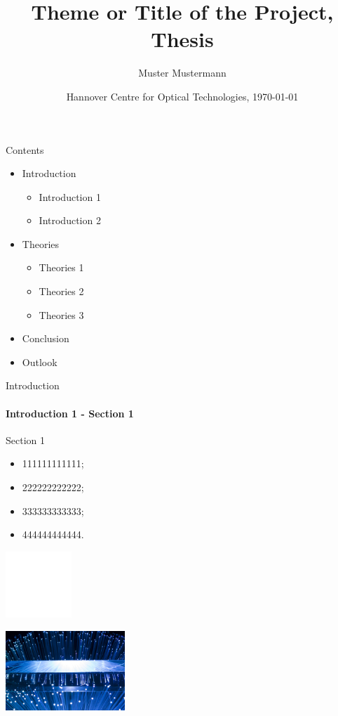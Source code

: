 \documentclass[t]{beamer}
\title{Theme or Title of the Project, Thesis}
\date[\today]{Hannover Centre for Optical Technologies, \today}
\author[Mustermann]{Muster Mustermann}
\institute[HOT]{Hannover Centre for Optical Technologies}
\begin{document}
\begin{frame}
\label{P1 Titlepage}
\titlepage
\end{frame}


\begin{frame}{Contents}
\label{P2 Content}

\begin{itemize}
  \item Introduction
    \begin{itemize}
        \item Introduction 1
	    \item Introduction 2
    \end{itemize}
    \item Theories
    \begin{itemize}
        \item Theories 1
	    \item Theories 2
	    \item Theories 3
    \end{itemize}
    \item Conclusion
    \item Outlook
\end{itemize}

\end{frame}


\begin{frame}{Introduction}
\framesubtitle{Introduction 1 - Section 1}
\label{P3 Introduction}

Section 1
\begin{itemize}
\item 111111111111;
\item 222222222222;
\item 333333333333;
\item 444444444444.
\end{itemize} 

\begin{minipage}[t]{.45\textwidth}
\centering
\includegraphics[width =25mm]{image/0}
\end{minipage}
\begin{minipage}[t]{.45\textwidth}
\centering
\includegraphics[width = 45mm]{image/a}
\end{minipage}

\end{frame}
\end{document}
